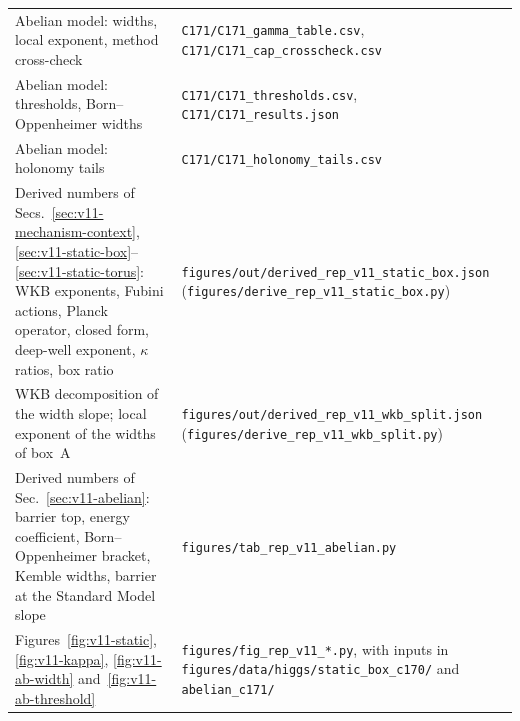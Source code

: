 \begin{table}[ht]
\begin{tabular}{@{}p{}p{}@{}}
Abelian model: widths, local exponent, method cross-check & \texttt{C171/\allowbreak C171\_gamma\_table.csv}, \texttt{C171/\allowbreak C171\_cap\_crosscheck.csv} \\
Abelian model: thresholds, Born--Oppenheimer widths & \texttt{C171/\allowbreak C171\_thresholds.csv}, \texttt{C171/\allowbreak C171\_results.json} \\
Abelian model: holonomy tails & \texttt{C171/\allowbreak C171\_holonomy\_tails.csv} \\
Derived numbers of Secs.~\ref{sec:v11-mechanism-context}, \ref{sec:v11-static-box}--\ref{sec:v11-static-torus}: WKB exponents, Fubini actions, Planck operator, closed form, deep-well exponent, $\kappa$ ratios, box ratio & \texttt{figures/\allowbreak out/\allowbreak derived\_rep\_v11\_static\_box.json} (\texttt{figures/\allowbreak derive\_rep\_v11\_static\_box.py}) \\
WKB decomposition of the width slope; local exponent of the widths of box~A & \texttt{figures/\allowbreak out/\allowbreak derived\_rep\_v11\_wkb\_split.json} (\texttt{figures/\allowbreak derive\_rep\_v11\_wkb\_split.py}) \\
Derived numbers of Sec.~\ref{sec:v11-abelian}: barrier top, energy coefficient, Born--Oppenheimer bracket, Kemble widths, barrier at the Standard Model slope & \texttt{figures/\allowbreak tab\_rep\_v11\_abelian.py} \\
Figures~\ref{fig:v11-static}, \ref{fig:v11-kappa}, \ref{fig:v11-ab-width} and~\ref{fig:v11-ab-threshold} & \texttt{figures/\allowbreak fig\_rep\_v11\_*.py}, with inputs in \texttt{figures/\allowbreak data/\allowbreak higgs/\allowbreak static\_box\_c170/} and \texttt{abelian\_c171/} \\
\bottomrule
\end{tabular}
\end{table}
